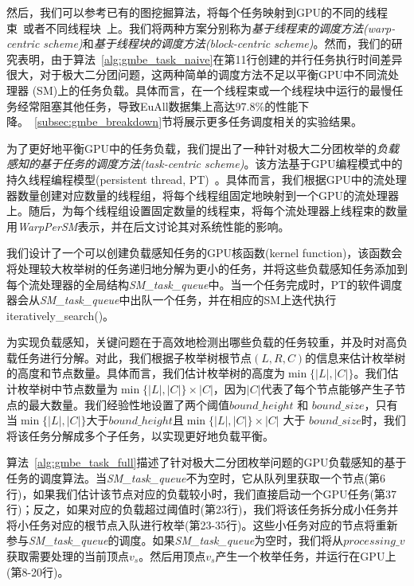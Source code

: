 然后，我们可以参考已有的图挖掘算法，将每个任务映射到GPU的不同的线程束~\cite{g2miner22}或者不同线程块~\cite{Kclique22}上。我们将两种方案分别称为\textit{基于线程束的调度方法(warp-centric scheme)}和\textit{基于线程块的调度方法(block-centric scheme)}。然而，我们的研究表明，由于算法~\ref{alg:gmbe_task_naive}在第11行创建的并行任务执行时间差异很大，对于极大二分团问题，这两种简单的调度方法不足以平衡GPU中不同流处理器 (SM)上的任务负载。具体而言，在一个线程束或一个线程块中运行的最慢任务经常阻塞其他任务，导致EuAll数据集上高达97.8\%的性能下降。~\ref{subsec:gmbe_breakdown}节将展示更多任务调度相关的实验结果。




为了更好地平衡GPU中的任务负载，我们提出了一种针对极大二分团枚举的\textit{负载感知的基于任务的调度方法(task-centric scheme)}。该方法基于GPU编程模式中的持久线程编程模型(persistent thread, PT)~\cite{PersistentThread12}。具体而言，我们根据GPU中的流处理器数量创建对应数量的线程组，将每个线程组固定地映射到一个GPU的流处理器上。随后，为每个线程组设置固定数量的线程束，将每个流处理器上线程束的数量用\textit{WarpPerSM}表示，并在后文讨论其对系统性能的影响。



我们设计了一个可以创建负载感知任务的GPU核函数(kernel function)，该函数会将处理较大枚举树的任务递归地分解为更小的任务，并将这些负载感知任务添加到每个流处理器的全局结构\textit{SM\_task\_queue}中。当一个任务完成时，PT的软件调度器会从\textit{SM\_task\_queue}中出队一个任务，并在相应的SM上迭代执行\textsf{}{iteratively\_search()}。

为实现负载感知，关键问题在于高效地检测出哪些负载的任务较重，并及时对高负载任务进行分解。对此，我们根据子枚举树根节点$(L,R,C)$的信息来估计枚举树的高度和节点数量。具体而言，我们估计枚举树的高度为$\min\{|L|,|C|\}$。我们估计枚举树中节点数量为$\min\{|L|,|C|\}\times|C|$，因为$|C|$代表了每个节点能够产生子节点的最大数量。我们经验性地设置了两个阈值$bound\_height$ 和 $bound\_size$，只有当$\min\{|L|,|C|\}$大于$bound\_height$且$\min\{|L|,|C|\}\times|C|$ 大于 $bound\_size$时，我们将该任务分解成多个子任务，以实现更好地负载平衡。

算法~\ref{alg:gmbe_task_full}描述了针对极大二分团枚举问题的GPU负载感知的基于任务的调度算法。当\textit{SM\_task\_queue}不为空时，它从队列里获取一个节点(第6行)，如果我们估计该节点对应的负载较小时，我们直接启动一个GPU任务(第37行)；反之，如果对应的负载超过阈值时(第23行)，我们将该任务拆分成小任务并将小任务对应的根节点入队进行枚举(第23-35行)。这些小任务对应的节点将重新参与\textit{SM\_task\_queue}的调度。如果\textit{SM\_task\_queue}为空时，我们将从$processing\_v$获取需要处理的当前顶点$v_s$。然后用顶点$v_s$产生一个枚举任务，并运行在GPU上(第8-20行)。

